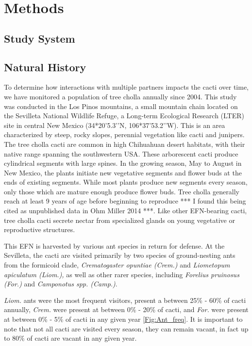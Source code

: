 \documentclass[12pt,a4paper]{article}
\begin{document}
\section*{Methods}
\subsection*{Study System}
\subsection*{Natural History}
To determine how interactions with multiple partners impacts the cacti over time, we have monitored a population of tree cholla annually since 2004. 
This study was conducted in the Los Pinos mountains, a small mountain chain located on the Sevilleta National Wildlife Refuge, a Long-term Ecological Research (LTER) site in central New Mexico (34*20’5.3’’N, 106*37’53.2’’W).
This is an area characterized by steep, rocky slopes, perennial vegetation like cacti and junipers. 
The tree cholla cacti are common in high Chihuahuan desert habitats, with their native range spanning the southwestern USA\cite{Benson1982}. 
These arborescent cacti produce cylindrical segments with large spines. 
In the growing season, May to August in New Mexico, the plants initiate new vegetative segments and flower buds at the ends of existing segments. 
While most plants produce new segments every season, only those which are mature enough produce flower buds. 
Tree cholla generally reach at least 9 years of age before beginning to reproduce *** I found this being cited as unpublished data in Ohm Miller 2014 ***. 
Like other EFN-bearing cacti, tree cholla cacti secrete nectar from specialized glands on young vegetative or reproductive structures\cite{Ness2006,Oliveira1999}.

This EFN is harvested by various ant species in return for defense. 
At the Sevilleta, the cacti are visited primarily by two species of ground-nesting ants from the formicoid clade, \textit{Crematogaster opuntiae (Crem.) } and \textit{Liometopum apiculatum (Liom.), } as well as other rarer species, including \textit{Forelius pruinosus (For.) } and \textit{Camponotus spp. (Camp.)}.

\textit{Liom.} ants were the most frequent visitors, present a  between 25\% - 60\% of cacti annually, \textit{Crem.} were present at between 0\% - 20\% of cacti, and \textit{For.} were present at between 0\% - 5\% of cacti in any given year \ref{Fig:Ant_freq}. 
It is important to note that not all cacti are visited every season, they can remain vacant, in fact up to 80\% of cacti are vacant in any given year. 
\end{document}

